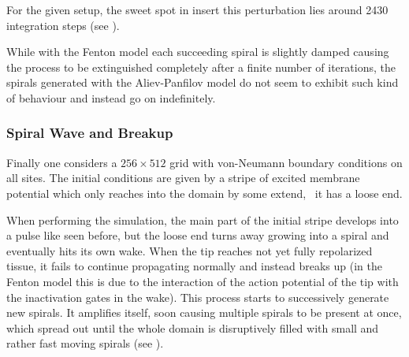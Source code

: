 For the given setup, the sweet spot in insert this perturbation lies around
2430 integration steps (see ).

While with the Fenton model each succeeding spiral is slightly damped causing
the process to be extinguished completely after a finite number of iterations,
the spirals generated with the Aliev-Panfilov model do not seem to exhibit such
kind of behaviour and instead go on indefinitely.


\subsubsection{Spiral Wave and Breakup}
\label{sec:spiral2}
Finally one considers a $256\times512$ grid with von-Neumann boundary
conditions on all sites. The initial conditions are given by a stripe of
excited membrane potential which only reaches into the domain by some extend,
\ie~it has a loose end.

When performing the simulation, the main part of the initial stripe develops
into a pulse like seen before, but the loose end turns away growing into a
spiral and eventually hits its own wake. When the tip reaches not yet fully
repolarized tissue, it fails to continue propagating normally and instead
breaks up (in the Fenton model this is due to the interaction of the action
potential of the tip with the inactivation gates in the wake). This process
starts to successively generate new spirals. It amplifies itself, soon causing
multiple spirals to be present at once, which spread out until the whole domain
is disruptively filled with small and rather fast moving spirals (see
).

